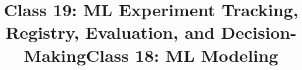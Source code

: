 
\usepackage{amssymb}

\newif\iftrackingdeck
\ifdefined\trackingdecksource
  \trackingdecktrue
  \title{Class 19: ML Experiment Tracking, Registry, Evaluation, and Decision-Making}
\else
  \trackingdeckfalse
  \title{Class 18: ML Modeling}
\fi
\author{\coursename}
\date{}


\newcommand{\partstrip}[1]{%
\begin{center}
\begin{tikzpicture}
\foreach \i/\l in {1/Modeling,2/Tracking,3/Registry,4/Evaluation,5/Decisions,6/Practice}{%
  \def\sty{flowbox}\ifnum\i=#1 \def\sty{accentbox}\fi
  \node[\sty, minimum width=1.75cm, minimum height=0.7cm, font=\scriptsize] at ({(\i-1)*1.95},0) {\i.\ \l};
}
\end{tikzpicture}
\end{center}}

\newcommand{\roadmaprow}[3]{%
\node[flowbox, minimum width=0.8cm, minimum height=0.8cm] (n#1) at (0,{-(#1-1)*1.1}) {\textbf{#1}};
\node[flowbox, anchor=west, text width=0.78\textwidth, align=left, minimum height=0.8cm] at ([xshift=0.15cm]n#1.east) {\textbf{#2}\\[-0.1em]{\scriptsize\color{coursegray}#3}};}

\newcommand{\partslide}[4]{%
\begin{frame}{Roadmap: part #1 of 6}
\vfill
\begin{center}
{\LARGE\bfseries\color{courseblue} #2}\\[0.8em]
{\large\itshape #3}\\[0.8em]
{\footnotesize\color{coursegray} #4}
\end{center}
\vfill
\partstrip{#1}
\coursefooter
\end{frame}}


